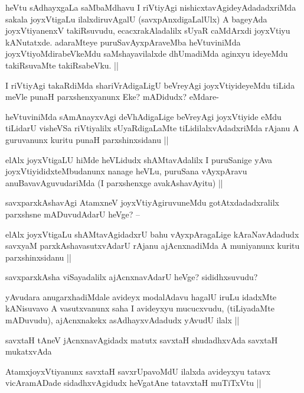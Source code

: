 \begin{artha}
heVtu sAdhayxgaLa saMbaMdhavu I riVtiyAgi nishicxtavAgideyAdadadxriMda sakala joyxVtigaLu ilalxdiruvAgalU (savxpAnxdigaLalUlx) A bageyAda joyxVtiyanenxV takiRsuvudu, ecacxrakAladalilx sUyaR caMdArxdi joyxVtiyu kANutatxde. adaraMteye puruSavAyxpAraveMba heVtuviniMda joyxVtiyoMdirabeVkeMdu saMshayavilalxde dhUmadiMda aginxyu ideyeMdu takiRsuvaMte takiRsabeVku. ||

I riVtiyAgi takaRdiMda shariVrAdigaLigU beVreyAgi joyxVtiyideyeMdu tiLida meVle punaH parxshenxyanunx Eke? mADidudx? eMdare-
\end{artha}

\begin{artha}
heVtuviniMda sAmAnayxvAgi deVhAdigaLige beVreyAgi joyxVtiyide eMdu tiLidarU visheVSa riVtiyalilx sUyaRdigaLaMte tiLidilalxvAdadxriMda rAjanu A guruvanunx kuritu punaH parxshinxsidanu ||
\end{artha}

\begin{artha}
elAlx joyxVtigaLU hiMde heVLidudx shAMtavAdalilx I puruSanige yAva joyxVtiyididxteMbudanunx nanage heVLu, puruSana vAyxpAravu anuBavavAguvudariMda (I parxshenxge avakAshavAyitu) ||

savxparxkAshavAgi AtamxneV joyxVtiyAgiruvuneMdu gotAtxdadadxralilx parxshsne mADuvudAdarU heVge? --
\end{artha}

\begin{artha}
elAlx joyxVtigaLu shAMtavAgidadxrU bahu vAyxpAragaLige kAraNavAdadudx savxyaM parxkAshavasutxvAdarU rAjanu ajAcnxnadiMda A muniyanunx kuritu parxshinxsidanu ||

savxparxkAsha viSayadalilx ajAcnxnavAdarU heVge? sididhxsuvudu?
\end{artha}

\begin{artha}
yAvudara anugarxhadiMdale avideyx modalAdavu hagalU iruLu idadxMte kANisuvavo A vasutxvanunx saha I avideyxyu mucucxvudu, (tiLiyadaMte mADuvudu), ajAcnxnakekx asAdhayxvAdadudx yAvudU ilalx ||
\end{artha}

\begin{artha}
savxtaH tAneV jAcnxnavAgidadx matutx savxtaH shudadhxvAda savxtaH mukatxvAda 
\end{artha}

\begin{artha}
AtamxjoyxVtiyanunx savxtaH savxrUpavoMdU ilalxda avideyxyu tatavx vicAramADade sidadhxvAgidudx heVgatAne tatavxtaH muTiTxVtu ||
\end{artha}

